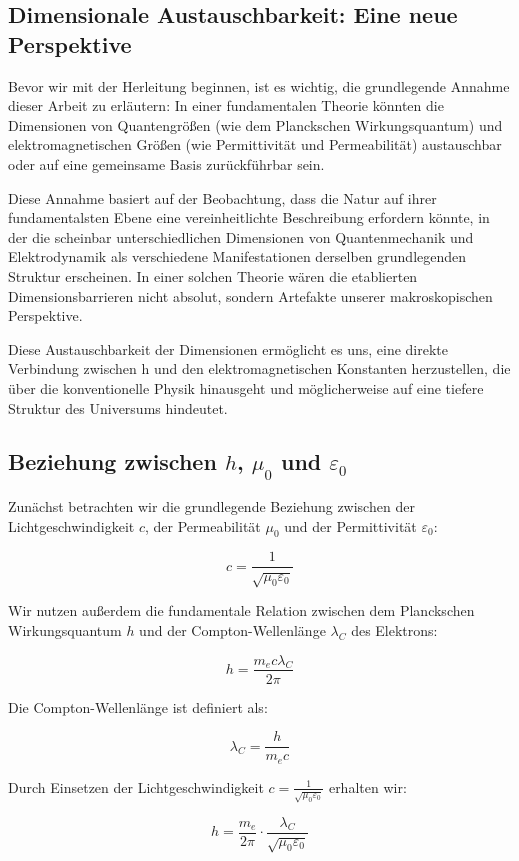 \documentclass{article}
\begin{document}
	\subsection{Dimensionale Austauschbarkeit: Eine neue Perspektive}
	
	Bevor wir mit der Herleitung beginnen, ist es wichtig, die grundlegende Annahme dieser Arbeit zu erläutern: In einer fundamentalen Theorie könnten die Dimensionen von Quantengrößen (wie dem Planckschen Wirkungsquantum) und elektromagnetischen Größen (wie Permittivität und Permeabilität) austauschbar oder auf eine gemeinsame Basis zurückführbar sein.
	
	Diese Annahme basiert auf der Beobachtung, dass die Natur auf ihrer fundamentalsten Ebene eine vereinheitlichte Beschreibung erfordern könnte, in der die scheinbar unterschiedlichen Dimensionen von Quantenmechanik und Elektrodynamik als verschiedene Manifestationen derselben grundlegenden Struktur erscheinen. In einer solchen Theorie wären die etablierten Dimensionsbarrieren nicht absolut, sondern Artefakte unserer makroskopischen Perspektive.
	
	Diese Austauschbarkeit der Dimensionen ermöglicht es uns, eine direkte Verbindung zwischen h und den elektromagnetischen Konstanten herzustellen, die über die konventionelle Physik hinausgeht und möglicherweise auf eine tiefere Struktur des Universums hindeutet.
	
	\subsection{Beziehung zwischen $h$, $\mu_0$ und $\varepsilon_0$}
	
	Zunächst betrachten wir die grundlegende Beziehung zwischen der Lichtgeschwindigkeit $c$, der Permeabilität $\mu_0$ und der Permittivität $\varepsilon_0$:
	
	$$c = \frac{1}{\sqrt{\mu_0\varepsilon_0}}$$
	
	Wir nutzen außerdem die fundamentale Relation zwischen dem Planckschen Wirkungsquantum $h$ und der Compton-Wellenlänge $\lambda_C$ des Elektrons:
	
	$$h = \frac{m_e c \lambda_C}{2\pi}$$
	
	Die Compton-Wellenlänge ist definiert als:
	
	$$\lambda_C = \frac{h}{m_e c}$$
	
	Durch Einsetzen der Lichtgeschwindigkeit $c = \frac{1}{\sqrt{\mu_0\varepsilon_0}}$ erhalten wir:
	
	$$h = \frac{m_e}{2\pi} \cdot \frac{\lambda_C}{\sqrt{\mu_0\varepsilon_0}}$$
	
\end{document}
